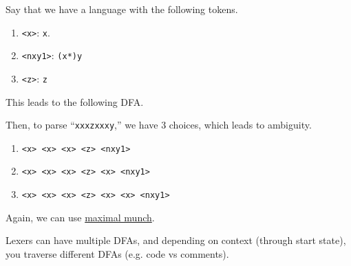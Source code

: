  \begin{example}
    \label{ex:ambiguities-in-tokenizing}
    Say that we have a language with the following tokens. 
    \begin{enumerate}
      \item \texttt{<x>}: \texttt{x}. 
      \item \texttt{<nxy1>}: \texttt{(x*)y} 
      \item \texttt{<z>}: \texttt{z}
    \end{enumerate}
    This leads to the following DFA. 

    \begin{figure}[H]
      \centering 
      \caption{} 
      \label{fig:dfa3choice}
    \end{figure}

    Then, to parse ``\texttt{xxxzxxxy},'' we have 3 choices, which leads to ambiguity. 
    \begin{enumerate}
      \item \texttt{<x> <x> <x> <z> <nxy1>}
      \item \texttt{<x> <x> <x> <z> <x> <nxy1>}
      \item \texttt{<x> <x> <x> <z> <x> <x> <nxy1>}
    \end{enumerate}
    Again, we can use \hyperref[def:maximal-munch]{maximal munch}.  
  \end{example}

  Lexers can have multiple DFAs, and depending on context (through start state), you traverse different DFAs (e.g. code vs comments). 

